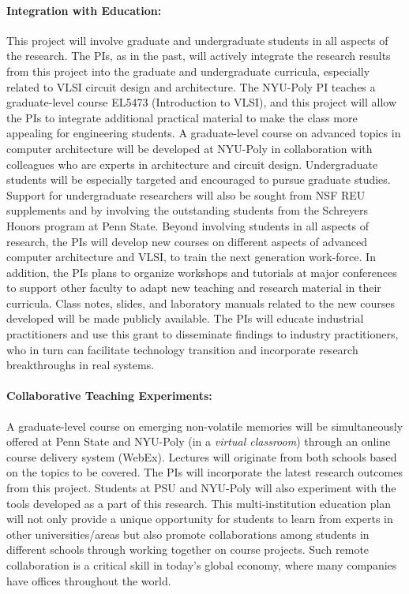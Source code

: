\paragraph{\textbf{Integration with Education:}} This project will
involve graduate and undergraduate students in all aspects of the
research. The PIs, as in the past, will actively integrate the
research results from this project into the graduate and
undergraduate curricula, especially related to VLSI circuit design and architecture.
The NYU-Poly
PI teaches a graduate-level course EL5473 (Introduction to VLSI), and this
project will allow the PIs to integrate additional practical
material to make the class more appealing for engineering
students. A graduate-level course on advanced topics in computer architecture
will be developed at NYU-Poly in collaboration with colleagues who are
experts in architecture and circuit design. Undergraduate students
will be especially targeted and encouraged to pursue graduate
studies.  Support for undergraduate researchers will also be
sought from NSF REU supplements and  by involving
the outstanding students from the Schreyers Honors program at Penn
State.
Beyond involving students in all aspects of research, the PIs will
develop new courses on different aspects of advanced computer architecture and VLSI, to train the next generation work-force. In
addition, the PIs plans to organize workshops and tutorials at
major conferences to support other faculty to adapt new teaching
and research material in their curricula. Class notes, slides, and
laboratory manuals related to the new courses developed will be
made publicly available.
The PIs will educate industrial
practitioners and use this grant to disseminate findings to
industry practitioners, who in turn can facilitate technology
transition and incorporate research breakthroughs in real systems.


\paragraph{\textbf{Collaborative Teaching Experiments}:}  A graduate-level course
on emerging non-volatile memories will be simultaneously offered at Penn State and NYU-Poly (in a \textit{virtual classroom}) through an online course
delivery system (WebEx). Lectures will originate from both schools
based on the topics to be covered. The PIs will incorporate the
latest research outcomes from this project. Students at PSU and
NYU-Poly will also experiment with the tools developed as a part of
this research. This multi-institution education plan will not only
provide a unique opportunity for students to learn from experts in
other universities/areas but also promote collaborations among
students in different schools through working together on course
projects. Such remote collaboration is a critical skill in today's
global economy, where many companies have offices throughout the
world.

